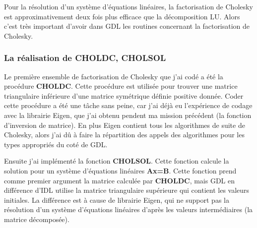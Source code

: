 Pour la résolution d'un système d'équations linéaires, la factorisation de Cholesky est approximativement deux fois plus efficace que la décomposition LU. Alors c'est très important d'avoir dans GDL les routines concernant la factorisation de Cholesky.

\subsubsection{La réalisation de CHOLDC, CHOLSOL}

Le première ensemble de factorisation de Cholesky que j'ai codé a été la
procédure \textbf{CHOLDC}. Cette procédure est utilisée pour trouver une matrice
triangulaire inférieure d'une matrice symétrique définie positive donnée. Coder cette procédure a été une tâche sans peine, car j'ai déjà eu l’expérience de codage avec la librairie Eigen, que j'ai obtenu pendent ma mission précédent (la fonction d'inversion de matrice). En plus Eigen contient tous les algorithmes de suite de Cholesky, alors j'ai dû à faire la répartition des appels des algorithmes pour les types appropriés du coté de GDL.

Ensuite j'ai implémenté la fonction \textbf{CHOLSOL}. Cette fonction calcule la
solution pour un système d'équations linéaires \textbf{Ax=B}. Cette fonction
prend comme premier argument la matrice calculée par \textbf{CHOLDC}, mais GDL en différence d'IDL utilise la matrice triangulaire supérieure qui contient les valeurs initiales. La différence est à cause de librairie Eigen, qui ne support pas la résolution d'un système d'équations linéaires d’après les valeurs intermédiaires (la matrice décomposée). \\

